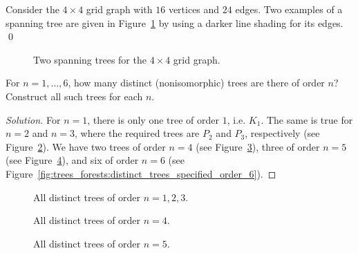 \begin{example}
\label{eg:trees_forests:spanning_tree}
{\rm
Consider the $4 \times 4$ grid graph with $16$
vertices and $24$ edges. Two examples of a
spanning tree are given in
Figure~\ref{fig:trees_forests:grid_graph_spanning_trees} by using a
darker line shading for its edges.}
\qed
\end{example}

\begin{figure}[!htbp]
\centering
{}

\caption{Two spanning trees for the $4 \times 4$ grid graph.}
\label{fig:trees_forests:grid_graph_spanning_trees}
\end{figure}

\begin{example}
For $n = 1, \dots, 6$, how many distinct
(nonisomorphic) trees are there of order
$n$? Construct all such trees for each $n$.
\end{example}

\begin{proof}[Solution]
For $n = 1$, there is only one tree of order $1$, i.e. $K_1$. The same
is true for $n = 2$ and $n = 3$, where the required trees are $P_2$
and $P_3$, respectively (see
Figure~\ref{fig:trees_forests:distinct_trees_specified_order_1_2_3}). We
have two trees of order $n = 4$ (see
Figure~\ref{fig:trees_forests:distinct_trees_specified_order_4}),
three of order $n = 5$ (see
Figure~\ref{fig:trees_forests:distinct_trees_specified_order_5}), and
six of order $n = 6$ (see
Figure~\ref{fig:trees_forests:distinct_trees_specified_order_6}).
\end{proof}

\begin{figure}[!htbp]
\centering
{}

\caption{All distinct trees of order $n = 1, 2, 3$.}
\label{fig:trees_forests:distinct_trees_specified_order_1_2_3}
\end{figure}

\begin{figure}[!htbp]
\centering
{}

\caption{All distinct trees of order $n = 4$.}
\label{fig:trees_forests:distinct_trees_specified_order_4}
\end{figure}

\begin{figure}[!htbp]
\centering
{}

\caption{All distinct trees of order $n = 5$.}
\label{fig:trees_forests:distinct_trees_specified_order_5}
\end{figure}


